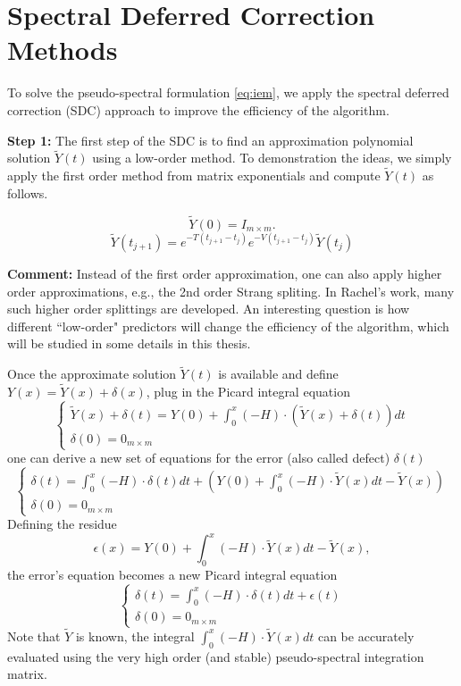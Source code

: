 \documentclass[12pt]{article}
\begin{document}
\section{Spectral Deferred Correction Methods}
To solve the pseudo-spectral formulation \ref{eq:iem}, we apply the spectral deferred correction (SDC) 
approach to improve the efficiency of the algorithm. 

{\noindent \bf Step 1:} The first step of the SDC is to find an approximation polynomial 
solution $\tilde{Y}(t)$ using a low-order method.
To demonstration the ideas, we simply apply the first order method from matrix exponentials and compute
$\tilde{Y}(t)$ as follows.

$$\tilde{Y}(0) = I_{m\times m}. $$
$$\tilde{Y}(t_{j+1}) = e^{-T (t_{j+1}-t_j)}e^{-V (t_{j+1}-t_j)} \tilde{Y}(t_{j}) $$

{\noindent \bf Comment:} Instead of the first order approximation, one can also apply higher order approximations,
e.g., the 2nd order Strang spliting.
In Rachel's work, many such higher order splittings are developed. An interesting question is how different ``low-order"
predictors will change the efficiency of the algorithm, which will be studied in some details in this thesis.

Once the approximate solution $\tilde{Y}(t)$ is available and define $Y(x)= \tilde{Y}(x) + \delta(x)$,
plug in the Picard integral equation
\begin{equation}
	\left\{
		\begin{array}{l}
			\tilde{Y}(x) + \delta(t)= Y(0) + \int_0^x (-H) \cdot (\tilde{Y}(x) + \delta(t) ) dt \\
			\delta(0) = 0_{m\times m}
		\end{array}
	\right.
\end{equation}
one can derive a new set of equations for the error (also called defect) $\delta(t)$ 
\begin{equation}
	\left\{
		\begin{array}{l}
			\delta(t)=  \int_0^x (-H) \cdot \delta(t) dt + 
			  \left( Y(0) + \int_0^x (-H) \cdot \tilde{Y}(x)  dt -\tilde{Y}(x) \right) \\
			\delta(0) = 0_{m\times m}
		\end{array}
	\right.
\end{equation}
Defining the residue 
$$\epsilon(x)= Y(0) + \int_0^x (-H) \cdot \tilde{Y}(x)  dt -\tilde{Y}(x),$$
the error's equation becomes a new Picard integral equation 
\begin{equation}
	\left\{
		\begin{array}{l}
			\delta(t)=  \int_0^x (-H) \cdot \delta(t) dt + \epsilon(t) \\
			\delta(0) = 0_{m\times m}
		\end{array}
	\right.
\end{equation}
Note that $\tilde{Y}$ is known, the integral $\int_0^x (-H) \cdot \tilde{Y}(x)  dt$
can be accurately evaluated using the very high order (and stable) pseudo-spectral integration matrix.
\end{document}
